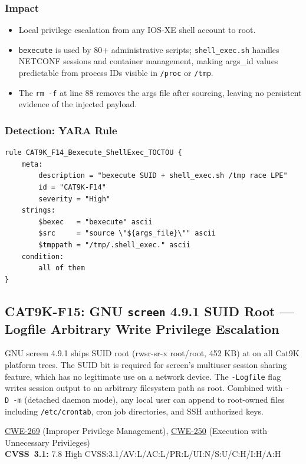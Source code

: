 \documentclass[11pt,a4paper]{article}
\begin{document}
\subsubsection{Impact}

\begin{itemize}[nosep]
  \item Local privilege escalation from any IOS-XE shell account to root.
  \item \texttt{bexecute} is used by 80+ administrative scripts; \texttt{shell\_exec.sh}
    handles NETCONF sessions and container management, making args\_id values
    predictable from process IDs visible in \texttt{/proc} or \texttt{/tmp}.
  \item The \texttt{rm -f} at line 88 removes the args file after sourcing,
    leaving no persistent evidence of the injected payload.
\end{itemize}

\subsubsection{Detection: YARA Rule}

\begin{lstlisting}[style=yara]
rule CAT9K_F14_Bexecute_ShellExec_TOCTOU {
    meta:
        description = "bexecute SUID + shell_exec.sh /tmp race LPE"
        id = "CAT9K-F14"
        severity = "High"
    strings:
        $bexec   = "bexecute" ascii
        $src     = "source \"${args_file}\"" ascii
        $tmppath = "/tmp/.shell_exec." ascii
    condition:
        all of them
}
\end{lstlisting}

\subsection{CAT9K-F15: GNU \texttt{screen} 4.9.1 SUID Root --- Logfile Arbitrary Write Privilege Escalation}

\begin{overviewbox}
GNU screen 4.9.1 ships SUID root (rwsr-sr-x root/root, 452 KB) at 
on all Cat9K platform trees. The SUID bit is required for screen's multiuser session
sharing feature, which has no legitimate use on a network device. The \texttt{-Logfile}
flag writes session output to an arbitrary filesystem path as root. Combined with
\texttt{-D~-m} (detached daemon mode), any local user can append to root-owned files
including \texttt{/etc/crontab}, cron job directories, and SSH authorized keys.

\href{https://cwe.mitre.org/data/definitions/269.html}{CWE-269} (Improper Privilege Management),
\href{https://cwe.mitre.org/data/definitions/250.html}{CWE-250} (Execution with Unnecessary Privileges)\\
\textbf{CVSS~3.1:} 7.8 High \quad CVSS:3.1/AV:L/AC:L/PR:L/UI:N/S:U/C:H/I:H/A:H
\end{overviewbox}
\end{document}
